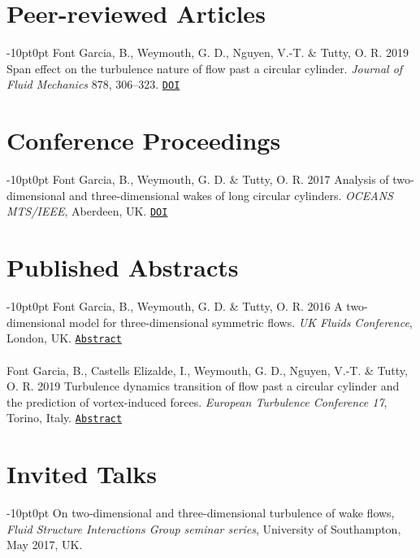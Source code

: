 \documentclass[line]{res}
\newenvironment{p}
  {\begin{adjustwidth}{-10pt}{0pt}}
  {\end{adjustwidth}}
\begin{document}
\begin{resume}
\section{Peer-reviewed Articles}
\begin{p}
Font Garcia, B., Weymouth, G. D., Nguyen, V.-T. \& Tutty, O. R. 2019 Span effect on the turbulence nature of flow past a circular cylinder. \textit{Journal of Fluid Mechanics} 878, 306--323. \href{https://doi.org/10.1017/jfm.2019.637}{\texttt{DOI}}
\end{p}

\section{Conference Proceedings}
\begin{p}
Font Garcia, B., Weymouth, G. D.  \&  Tutty, O. R. 2017 Analysis of two-dimensional and three-dimensional wakes of long circular cylinders. {\em OCEANS MTS/IEEE}, Aberdeen, 	UK. \href{https://doi.org/10.1109/OCEANSE.2017.8084904}{\texttt{DOI}}
\end{p}

\section{Published Abstracts}
\begin{p}
Font Garcia, B., Weymouth, G. D.  \&  Tutty, O. R. 2016  A two-dimensional model for three-dimensional symmetric flows. \textit{UK Fluids Conference}, London, UK.  \href{https://www.imperial.ac.uk/media/imperial-college/faculty-of-engineering/aeronautics/UK-Fluids-Conference-2016-booklet.pdf}{\texttt{Abstract}}\\
\\
Font Garcia, B., Castells Elizalde, I., Weymouth, G. D., Nguyen, V.-T.  \&  Tutty, O. R. 2019  Turbulence dynamics transition of flow past a circular cylinder and the prediction of vortex-induced forces. \textit{European Turbulence Conference 17}, Torino, Italy.  \href{https://etc17.fyper.com/program/show_slot/41}{\texttt{Abstract}}
\end{p}

\section{Invited Talks}
\begin{p}
On two-dimensional and three-dimensional turbulence of wake flows, \textit{Fluid Structure Interactions Group seminar series}, University of Southampton, May 2017, UK.
\end{p}


\end{resume}
\end{document}
